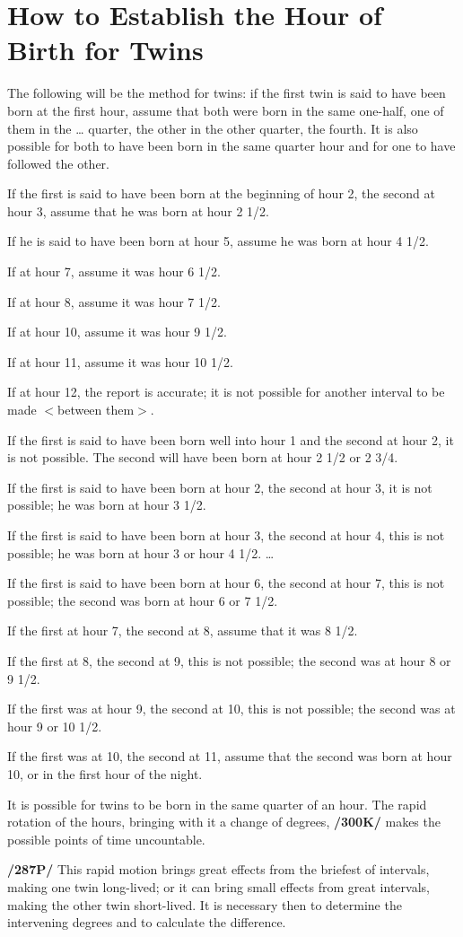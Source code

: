 \section{How to Establish the Hour of Birth for Twins}

The following will be the method for twins: if the first twin is said to have been born at the first hour, assume that both were born in the same one-half, one of them in the … quarter, the other in the other
quarter, the fourth. It is also possible for both to have been born in the same quarter hour and for one to have followed the other.

If the first is said to have been born at the beginning of hour 2, the second at hour 3, assume that he was born at hour 2 1/2.

If he is said to have been born at hour 5, assume he was born at hour 4 1/2.

If at hour 7, assume it was hour 6 1/2.

If at hour 8, assume it was hour 7 1/2.

If at hour 10, assume it was hour 9 1/2.

If at hour 11, assume it was hour 10 1/2.

If at hour 12, the report is accurate; it is not possible for another interval to be made $<$between them$>$.

If the first is said to have been born well into hour 1 and the second at hour 2, it is not possible. The second will have been born at hour 2 1/2 or 2 3/4.

If the first is said to have been born at hour 2, the second at hour 3, it is not possible; he was born at hour 3 1/2.

If the first is said to have been born at hour 3, the second at hour 4, this is not possible; he was born at hour 3 or hour 4 1/2.
…

If the first is said to have been born at hour 6, the second at hour 7, this is not possible; the second was born at hour 6 or 7 1/2.

If the first at hour 7, the second at 8, assume that it was 8 1/2.

If the first at 8, the second at 9, this is not possible; the second was at hour 8 or 9 1/2.

If the first was at hour 9, the second at 10, this is not possible; the second was at hour 9 or 10 1/2.

If the first was at 10, the second at 11, assume that the second was born at hour 10, or in the first hour of the night.

It is possible for twins to be born in the same quarter of an hour. The rapid rotation of the hours, bringing with it a change of degrees, \textbf{/300K/} makes the possible points of time uncountable.

\textbf{/287P/} This rapid motion brings great effects from the briefest of intervals, making one twin long-lived; or it can bring small effects from great intervals, making the other twin short-lived. It is necessary then to determine the intervening degrees and to calculate the difference.

\newpage